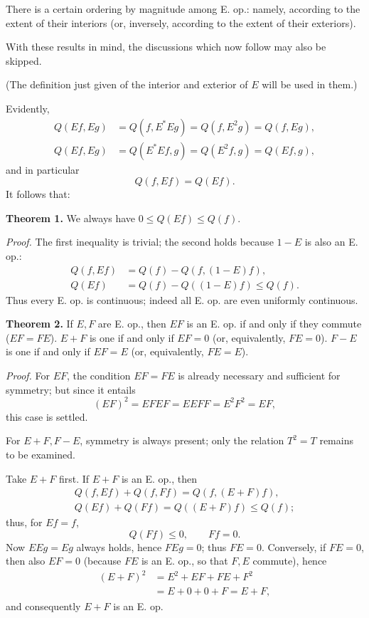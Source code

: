 \documentclass[fontsize=13pt,paper=b5,twoside,bookmarkpackage=false]{scrartcl}
\begin{document}
There is a certain ordering by magnitude among E. op.: namely, according to the extent of their interiors (or, inversely, according to the extent of their exteriors).

With these results in mind, the discussions which now follow may also be skipped.

(The definition just given of the interior and exterior of $E$ will be used in them.)

Evidently,
\begin{align*}
 Q(Ef,Eg)&=Q(f,E^*Eg)=Q(f,E^2g)=Q(f,Eg),\\
 Q(Ef,Eg)&=Q(E^*Ef,g)=Q(E^2f,g)=Q(Ef,g),
\end{align*}
and in particular
\[
 Q(f,Ef)=Q(Ef).
\]
It follows that:

\par\medskip\noindent{}\label{thm:VIII:1}\textbf{Theorem 1.}
We always have $0\leq Q(Ef)\leq Q(f)$.

\par\noindent\textit{Proof.}
The first inequality is trivial; the second holds because $1-E$ is also an E. op.:
\begin{align*}
 Q(f,Ef)&=Q(f)-Q(f,(1-E)f),\\
 Q(Ef)&=Q(f)-Q((1-E)f)\leq Q(f).
\end{align*}
Thus every E. op. is continuous; indeed all E. op. are even uniformly continuous.

\par\medskip\noindent{}\label{thm:VIII:2}\textbf{Theorem 2.}
If $E,F$ are E. op., then $EF$ is an E. op. if and only if they commute ($EF=FE$). $E+F$ is one if and only if $EF=0$ (or, equivalently, $FE=0$). $F-E$ is one if and only if $EF=E$ (or, equivalently, $FE=E$).

\par\noindent\textit{Proof.}
For $EF$, the condition $EF=FE$ is already necessary and sufficient for symmetry; but since it entails
\[
 (EF)^2=EFEF=EEFF=E^2F^2=EF,
\]
this case is settled.

For $E+F,F-E$, symmetry is always present; only the relation $T^2=T$ remains to be examined.

Take $E+F$ first. If $E+F$ is an E. op., then
\begin{gather*}
 Q(f,Ef)+Q(f,Ff)=Q(f,(E+F)f),\\
 Q(Ef)+Q(Ff)=Q((E+F)f)\leq Q(f);
\end{gather*}
thus, for $Ef=f$,
\[
 Q(Ff)\leq0,\qquad Ff=0.
\]
Now $EEg=Eg$ always holds, hence $FEg=0$; thus $FE=0$. Conversely, if $FE=0$, then also $EF=0$ (because $FE$ is an E. op., so that $F,E$ commute), hence
\begin{align*}
 (E+F)^2&=E^2+EF+FE+F^2\\
 &=E+0+0+F=E+F,
\end{align*}
and consequently $E+F$ is an E. op.
\end{document}
